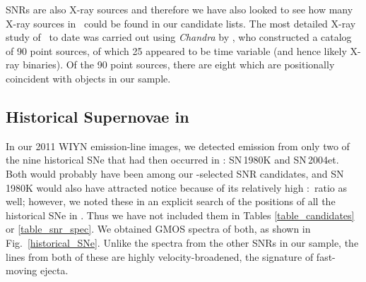 SNRs are also X-ray sources and therefore we have also looked to see how many X-ray sources in \gal\ could be found in our candidate lists.  The most detailed X-ray study of \gal\ to date was carried out using {\em Chandra} by \cite{fridriksson08}, who constructed a catalog of 90 point sources, of which 25 appeared to be time variable (and hence likely X-ray binaries).  Of the 90 point sources, there are eight which are positionally coincident with objects in our sample. 



\subsection{Historical Supernovae in \gal}
In our 2011 WIYN emission-line images, we detected emission from only two of the nine historical SNe that had then occurred in \gal: SN\,1980K and SN\,2004et.  Both would probably have been among our \sii-selected SNR candidates, and SN\,1980K would also have attracted notice because of its relatively high \oiii:\ha\ ratio as well; however, we noted these in an explicit search of the positions of all the historical SNe in \gal.  Thus we have not included them in Tables \ref{table_candidates} or \ref{table_snr_spec}.
We  obtained GMOS spectra of both, as shown in Fig.~\ref{historical_SNe}.  Unlike the spectra from the other SNRs in our sample, the lines from both of these are highly velocity-broadened, the signature of fast-moving ejecta.

